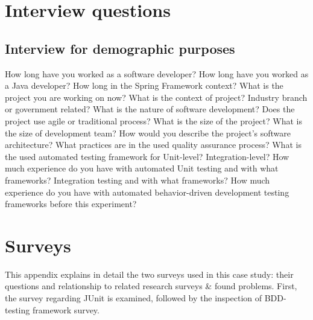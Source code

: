 \chapter{Interview questions}
\label{chapter:interview}
\section{Interview for demographic purposes}
    \label{section:demographic}
    \begin{outline}[enumerate]
    \1 How long have you worked as a software developer?
    \1 How long have you worked as a Java developer?
        \2 How long in the Spring Framework context?
    \1 What is the project you are working on now?
        \2 What is the context of project?
            \3 Industry branch or government related?
            \3 What is the nature of software development?
        \2 Does the project use agile or traditional process?
        \2 What is the size of the project?
        \2 What is the size of development team?
        \2 How would you describe the project's software architecture?
        \2 What practices are in the used quality assurance process?
        \2 What is the used automated testing framework for
            \3 Unit-level?
            \3 Integration-level?
    \1 How much experience do you have with automated
        \2 Unit testing and with what frameworks?
        \2 Integration testing and with what frameworks?
    \1 How much experience do you have with automated behavior-driven development testing frameworks before this experiment?
    \end{outline}
\restoregeometry
{}
\chapter{Surveys}
\label{chapter:surveys}
This appendix explains in detail the two surveys used in this case study: their questions and relationship to related
research surveys \& found problems. First, the survey regarding JUnit is examined, followed by the inspection of BDD-testing
framework survey.
